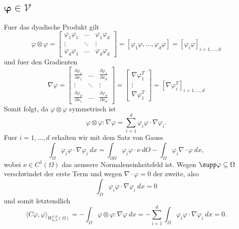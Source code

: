 \documentclass{article}
\begin{document}
\subsection*{$\bm{\varphi \in \mathcal{V}}$}

Fuer das dyadische Produkt gilt
\begin{equation*}
  \varphi \otimes \varphi
  = \begin{bmatrix}
    \varphi_1 \varphi_1 & \hdots & \varphi_1 \varphi_d\\
    \vdots & \ddots & \vdots \\
    \varphi_d \varphi_1 & \hdots & \varphi_d \varphi_d
  \end{bmatrix}
  = \left[\varphi_1 \varphi, \dots, \varphi_d \varphi\right]
  = \left[\varphi_i \varphi\right]_{i=1, \dots, d}
\end{equation*}
und fuer den Gradienten
\begin{equation*}
  \nabla \varphi
  = \begin{bmatrix}
    \frac{\partial \varphi_1}{\partial x_1} & \hdots & \frac{\partial \varphi_1}{\partial x_d} \\
    \vdots & \ddots & \vdots \\
    \frac{\partial \varphi_d}{\partial x_1} & \hdots & \frac{\partial \varphi_d}{\partial x_d}
  \end{bmatrix}
  = \begin{bmatrix}
    \nabla \varphi_1^T \\
    \vdots \\
    \nabla \varphi_1^T
  \end{bmatrix}
  = \left[\nabla \varphi_i^T\right]_{i=1, \dots, d}
\end{equation*}
Somit folgt, da $\varphi \otimes \varphi$ symmetrisch ist
\begin{equation*}
  \varphi \otimes \varphi : \nabla \varphi
  = \sum_{i = 1}^{d} \varphi_i \varphi \cdot \nabla \varphi_i.
\end{equation*}
Fuer $i = 1, \dots, d$ erhalten wir mit dem Satz von Gauss
\begin{equation*}
  \int_{\Omega}^{} \varphi_i \varphi \cdot \nabla \varphi_i \ dx
  = \int_{\partial \Omega}^{} \varphi_i \varphi \cdot \nu \ dO
  - \int_{\Omega}^{} \varphi_i \nabla \cdot \varphi \ dx,
\end{equation*}
wobei $\nu \in C^1(\Omega)$ das aeussere Normaleneinheitsfeld ist. Wegen $\supp \varphi \subseteq \Omega$ verschwindet der erste Term und wegen $\nabla \cdot \varphi = 0$ der zweite, also
\begin{equation*}
  \int_{\Omega}^{} \varphi_i \varphi \cdot \nabla \varphi_i \ dx
  = 0
\end{equation*}
und somit letztendlich
\begin{equation*}
  \langle C \varphi, \varphi \rangle_{W_{0, \sigma}^{1,p} (\Omega)}
  = - \int_{\Omega}^{} \varphi \otimes \varphi : \nabla \varphi \ dx
  = - \sum_{i = 1}^{d} \int_{\Omega}^{} \varphi_i \varphi \cdot \nabla \varphi_i \ dx
  = 0.
\end{equation*}
\end{document}
